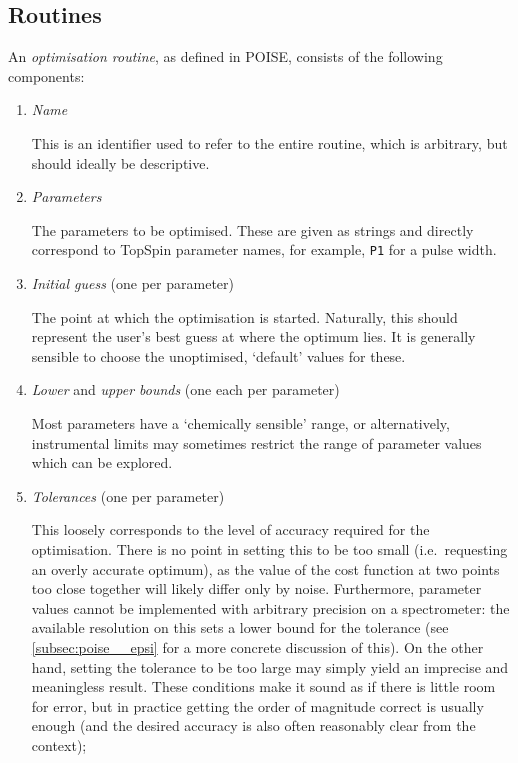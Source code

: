 \subsection{Routines}
\label{subsec:poise__routines}

An \textit{optimisation routine}, as defined in POISE, consists of the following components:

\begin{enumerate}
    \item \textit{Name}

        This is an identifier used to refer to the entire routine, which is arbitrary, but should ideally be descriptive.

    \item \textit{Parameters}

        The parameters to be optimised.
        These are given as strings and directly correspond to TopSpin parameter names, for example, \texttt{P1} for a pulse width.

    \item \textit{Initial guess} (one per parameter)

        The point at which the optimisation is started.
        Naturally, this should represent the user's best guess at where the optimum lies.
        It is generally sensible to choose the unoptimised, `default' values for these.
        
    \item \textit{Lower} and \textit{upper bounds} (one each per parameter)

        Most parameters have a `chemically sensible' range, or alternatively, instrumental limits may sometimes restrict the range of parameter values which can be explored.

    \item \textit{Tolerances} (one per parameter)

        This loosely corresponds to the level of accuracy required for the optimisation.
        There is no point in setting this to be too small (i.e.\ requesting an overly accurate optimum), as the value of the cost function at two points too close together will likely differ only by noise.
        Furthermore, parameter values cannot be implemented with arbitrary precision on a spectrometer: the available resolution on this sets a lower bound for the tolerance (see \cref{subsec:poise__epsi} for a more concrete discussion of this).
        On the other hand, setting the tolerance to be too large may simply yield an imprecise and meaningless result.
        These conditions make it sound as if there is little room for error, but in practice getting the order of magnitude correct is usually enough (and the desired accuracy is also often reasonably clear from the context);


\end{enumerate}
